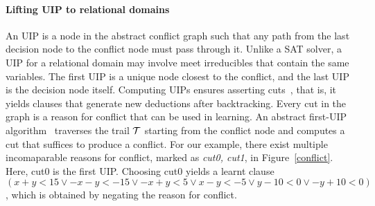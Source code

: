 \paragraph {\textbf{Lifting UIP to relational domains}}
An UIP is a node in the abstract conflict graph such that 
any path from the last decision node to the conflict node must pass 
through it.  Unlike a SAT solver, a UIP for a relational domain may 
involve meet irreducibles that contain the same variables.  The 
first UIP is a unique node closest to the conflict, and the last UIP 
is the decision node itself.  Computing UIPs ensures asserting
cuts~\cite{cdcl,DBLP:journals/fmsd/BrainDGHK14}, that is, it 
yields clauses that generate new deductions after backtracking.  
Every cut in the graph is a reason for conflict that can be 
used in learning.  An abstract first-UIP algorithm~\cite{DBLP:journals/fmsd/BrainDGHK14} 
traverses the trail $\mathcal{T}$ starting from the conflict node and 
computes a cut that suffices to produce a conflict. 
For our example, there exist multiple incomaparable reasons for conflict,
marked as {\em cut0, cut1}, in Figure~\ref{conflict}.  Here, cut0 is the first UIP.  
Choosing cut0 yields a learnt clause 
$(x+y<15 \vee -x-y<-15 \vee -x+y<5 \vee x-y<-5 \vee y-10<0 \vee -y+10<0)$, 
which is obtained by negating the reason for conflict.  
%    

